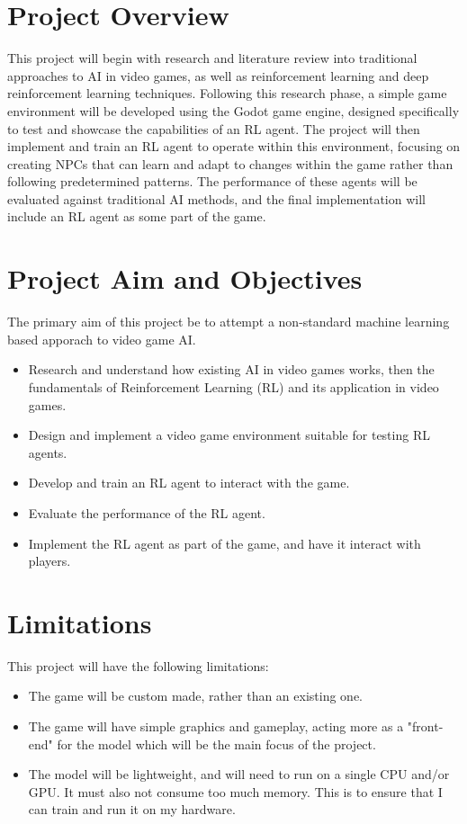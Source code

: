 \section{Project Overview}
This project will begin with research and literature review into traditional approaches to AI in video games, as well as reinforcement learning and deep reinforcement learning techniques. 
Following this research phase, a simple game environment will be developed using the Godot game engine, designed specifically to test and showcase the capabilities of an RL agent. 
The project will then implement and train an RL agent to operate within this environment, focusing on creating NPCs that can learn and adapt to changes within the game rather than following predetermined patterns. 
The performance of these agents will be evaluated against traditional AI methods, and the final implementation will include an RL agent as some part of the game. 

\section{Project Aim and Objectives}
The primary aim of this project be to attempt a non-standard machine learning based apporach to video game AI.
\begin{itemize} 
    \item Research and understand how existing AI in video games works, then the fundamentals of Reinforcement Learning (RL) and its application in video games.
    \item Design and implement a video game environment suitable for testing RL agents.
    \item Develop and train an RL agent to interact with the game.
    \item Evaluate the performance of the RL agent.
    \item Implement the RL agent as part of the game, and have it interact with players.
\end{itemize}

\section{Limitations}
This project will have the following limitations:
\begin{itemize} 
    \item The game will be custom made, rather than an existing one.
    \item The game will have simple graphics and gameplay, acting more as a "front-end" for the model which will be the main focus of the project.
    \item The model will be lightweight, and will need to run on a single CPU and/or GPU. It must also not consume too much memory. This is to ensure that I can train and run it on my hardware.
\end{itemize}
